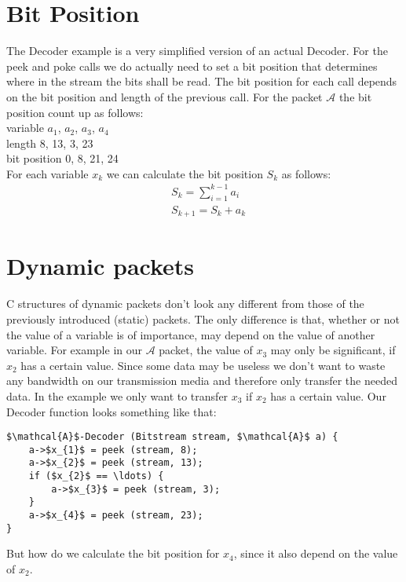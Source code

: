 \documentclass[parskip=full,paper=a4,DIV=12]{scrartcl}
\begin{document}
\section{Bit Position}

The Decoder example is a very simplified version of an actual Decoder.
For the peek and poke calls we do actually need to set a bit position
that determines where in the stream the bits shall be read.
The bit position for each call depends on the bit position and length of the previous call.
For the packet $\mathcal{A}$ the bit position count up as follows:\\
variable   $a_{1}$, $a_{2}$, $a_{3}$, $a_{4}$\\
length      8, 13,  3, 23\\
bit position      0,  8, 21, 24\\
For each variable $x_{k}$ we can calculate the bit position $S_{k}$ as follows:
\begin{align*}
	&S_{k} = \sum_{i=1}^{k-1} a_{i}\\
	&S_{k+1} = S_{k} + a_{k}
\end{align*}

\section{Dynamic packets}

C structures of dynamic packets don't look any different from those of the previously introduced (static) packets.
The only difference is that, whether or not the value of a variable is of importance, may depend on the value of another variable.	
For example in our $\mathcal{A}$ packet, the value of $x_{3}$ may only be significant, if $x_{2}$ has a certain value.
Since some data may be useless we don't want to waste any bandwidth on our transmission media and therefore only transfer the needed data.
In the example we only want to transfer $x_{3}$ if $x_{2}$ has a certain value.
Our Decoder function looks something like that:

\begin{lstlisting}[mathescape]
$\mathcal{A}$-Decoder (Bitstream stream, $\mathcal{A}$ a) {
	a->$x_{1}$ = peek (stream, 8);
	a->$x_{2}$ = peek (stream, 13);
	if ($x_{2}$ == \ldots) {
		a->$x_{3}$ = peek (stream, 3);
	}
	a->$x_{4}$ = peek (stream, 23);
}
\end{lstlisting}

But how do we calculate the bit position for $x_{4}$, since it also depend on the value of $x_{2}$.
\end{document}
